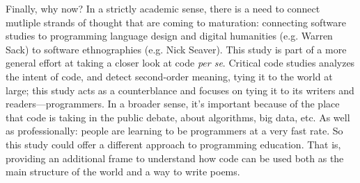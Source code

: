 Finally, why now? In a strictly academic sense, there is a need to connect mutliple strands of thought that are coming to maturation: connecting software studies to programming language design and digital humanities (e.g. Warren Sack) to software ethnographies (e.g. Nick Seaver). This study is part of a more general effort at taking a closer look at code \emph{per se}. Critical code studies analyzes the intent of code, and detect second-order meaning, tying it to the world at large; this study acts as a counterblance and focuses on tying it to its writers and readers—programmers.
In a broader sense, it's important because of the place that code is taking in the public debate, about algorithms, big data, etc. As well as professionally: people are learning to be programmers at a very fast rate. So this study could offer a different approach to programming education. That is, providing an additional frame to understand how code can be used both as the main structure of the world and a way to write poems.